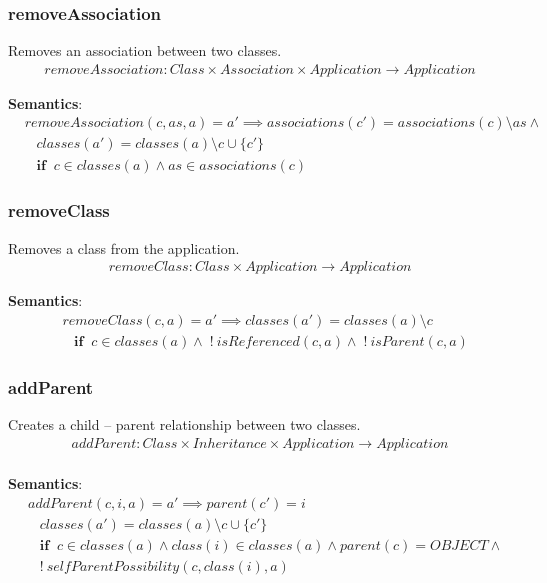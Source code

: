 \documentclass[10pt]{article}
\begin{document}
\subsubsection{removeAssociation}
Removes an association between two classes.
\begin{align}
removeAssociation: Class \times Association \times Application \rightarrow Application
\end{align}

\noindent \textbf{Semantics}:
\begin{align}
& removeAssociation(c, as, a) = a' \implies associations(c') = associations(c) \setminus as \land \nonumber \\
& \;\;\; classes(a') = classes(a) \setminus c  \cup \{c'\} \nonumber \\
& \;\;\; \mathbf{if} \;\; c \in classes(a) \land as \in associations(c)
\end{align}

\subsubsection{removeClass}
Removes a class from the application.
\begin{align}
removeClass: Class \times Application \rightarrow Application
\end{align}

\noindent \textbf{Semantics}:
\begin{align}
& removeClass(c, a) = a' \implies  classes(a') = classes(a) \setminus c \nonumber \\
& \;\;\; \mathbf{if} \;\; c \in classes(a) \land \; ! \: isReferenced(c, a) \land \; ! \: isParent(c, a)
\end{align}

\subsubsection{addParent}
Creates a child -- parent relationship between two classes.
\begin{align}
addParent: Class \times Inheritance \times Application \rightarrow Application \\
\end{align}

\noindent \textbf{Semantics}:
\begin{align}
& addParent(c, i, a) = a' \implies parent(c') = i  \nonumber \\
& \;\;\; classes(a') = classes(a) \setminus c  \cup \{c'\} \nonumber \\
& \;\;\; \mathbf{if} \;\; c \in classes(a) \land class(i) \in classes(a) \land parent(c)= OBJECT \land \nonumber \\
& \;\;\; ! \: selfParentPossibility(c, class(i), a)
\end{align}
\end{document}
